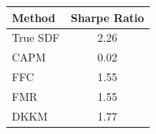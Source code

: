 \begin{tabular}{l c}
\toprule
Method & Sharpe Ratio \\
\midrule
True SDF & 2.26 \\
\midrule
CAPM & 0.02 \\
FFC & 1.55 \\
FMR & 1.55 \\
DKKM & 1.77 \\
\bottomrule
\end{tabular}